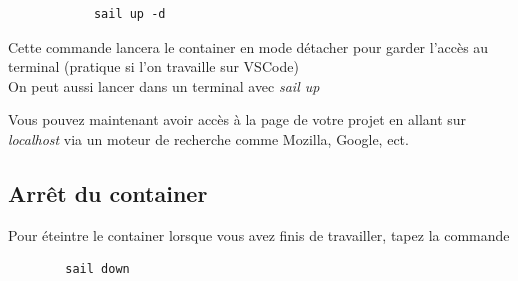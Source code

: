 \documentclass[internal]{nhitec_design}
\begin{document}
        \begin{lstlisting}
            sail up -d
        \end{lstlisting}

        Cette commande lancera le container en mode détacher pour garder l'accès au terminal (pratique si l'on travaille sur VSCode)\\
        \footnotesize{On peut aussi lancer dans un terminal avec \textit{sail up}}


        Vous pouvez maintenant avoir accès à la page de votre projet en allant sur \textit{localhost} via un moteur de recherche comme Mozilla, Google, ect.

    \subsection{Arrêt du container}

    Pour éteintre le container lorsque vous avez finis de travailler, tapez la commande

    \begin{lstlisting}
        sail down
    \end{lstlisting}
    
\end{document}
